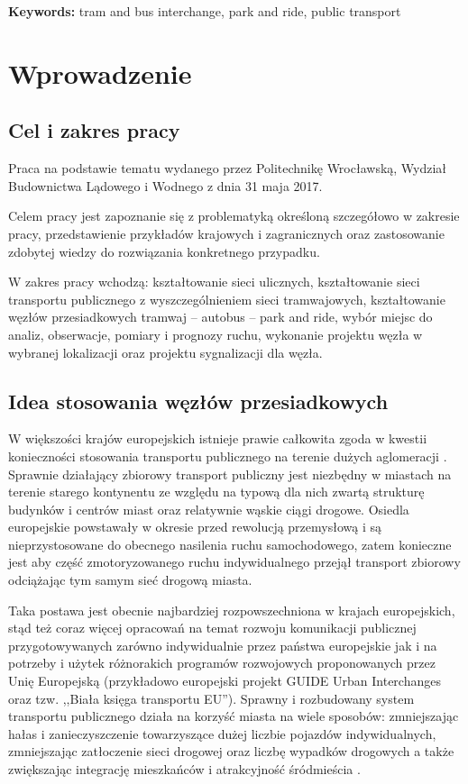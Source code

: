 \documentclass[twoside,12pt]{article}
\begin{document}
\textbf{Keywords:} tram and bus interchange, park and ride, public transport



\clearpage

\section{Wprowadzenie}

	\subsection{Cel i zakres pracy}
	
	Praca na podstawie tematu wydanego przez Politechnikę Wrocławską, Wydział Budownictwa Lądowego i Wodnego z dnia 31 maja 2017. 
	
	Celem pracy jest zapoznanie się z problematyką określoną szczegółowo w zakresie pracy, przedstawienie przykładów krajowych i zagranicznych oraz zastosowanie zdobytej wiedzy do rozwiązania konkretnego przypadku.
	
	W zakres pracy wchodzą: kształtowanie sieci ulicznych, kształtowanie sieci transportu publicznego z wyszczególnieniem sieci tramwajowych, kształtowanie węzłów przesiadkowych tramwaj -- autobus -- park and ride, wybór miejsc do analiz, obserwacje, pomiary i prognozy ruchu, wykonanie projektu węzła w wybranej lokalizacji oraz projektu sygnalizacji dla węzła.

	\subsection{Idea stosowania węzłów przesiadkowych}
	
	W większości krajów europejskich istnieje prawie całkowita zgoda w kwestii konieczności stosowania transportu publicznego na terenie dużych aglomeracji \cite{guide}. Sprawnie działający zbiorowy transport publiczny jest niezbędny w miastach na terenie starego kontynentu ze względu na typową dla nich zwartą strukturę budynków i centrów miast oraz relatywnie wąskie ciągi drogowe. Osiedla europejskie powstawały w okresie przed rewolucją przemysłową i są nieprzystosowane do obecnego nasilenia ruchu samochodowego, zatem konieczne jest aby część zmotoryzowanego ruchu indywidualnego przejął transport zbiorowy odciążając tym samym sieć drogową miasta. 
	
	Taka postawa jest obecnie najbardziej rozpowszechniona w krajach europejskich, stąd też coraz więcej opracowań na temat rozwoju komunikacji publicznej przygotowywanych zarówno indywidualnie przez państwa europejskie jak i na potrzeby i użytek różnorakich programów rozwojowych proponowanych przez Unię Europejską (przykładowo europejski projekt GUIDE Urban Interchanges oraz tzw. ,,Biała księga transportu EU''). Sprawny i rozbudowany system transportu publicznego działa na korzyść miasta na wiele sposobów: zmniejszając hałas i zanieczyszczenie towarzyszące dużej liczbie pojazdów indywidualnych, zmniejszając zatłoczenie sieci drogowej oraz liczbę wypadków drogowych \cite{szarata} a także zwiększając integrację mieszkańców i atrakcyjność śródmieścia \cite{guide}.  
	
\end{document}
